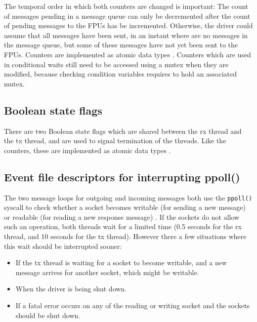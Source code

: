 \documentclass[fontsize=12,a4paper]{scrartcl}
\begin{document}
The temporal order in which both counters are changed is important:
The count of messages pending in a message queue can only be
decremented after the count of pending messages to the FPUs has be
incremented. Otherwise, the driver could assume that all messages have
been sent, in an instant where are no messages in the message queue,
but some of these messages have not yet been sent to the FPUs.
Counters are implemented as atomic data types \cite[see chapter
  5]{Williams:CppConcurrency}. Counters which are used in conditional
waits still need to be accessed using a mutex when they are modified,
because checking condition variables requires to hold an associated
mutex.



\subsection{Boolean state flags}

There are two Boolean state flags which are shared between the rx
thread and the tx thread, and are used to signal termination of the
threads. Like the counters, these are implemented as atomic data types
\cite[see chapter 5]{Williams:CppConcurrency}.

\subsection{Event file descriptors for interrupting ppoll()}

The two message loops for outgoing and incoming messages both use the
\texttt{ppoll()} syscall to check whether a socket becomes writable
(for sending a new message) or readable (for reading a new response
message) \cite[p. 51, p61]{Love:2013:LSP}. If the sockets do not allow
such an operation, both threads wait for a limited time (0.5 seconds
for the rx thread, and 10 seconds for the tx thread). However there a
few situations where this wait should be interrupted sooner:

\begin{itemize}
\item If the tx thread is waiting for a socket to become
  writable, and a new message arrives for another socket,
  which might be writable.
\item When the driver is being shut down.
\item If a fatal error occurs on any of the reading or writing socket
  and the sockets should be shut down.
\end{itemize}
\end{document}
